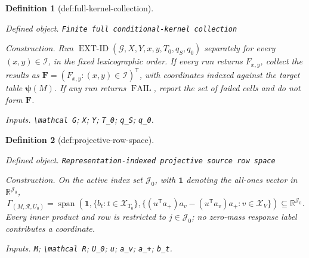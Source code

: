\documentclass{article}
\newtheorem{definition}{Definition}
\begin{document}
\begin{definition}[def:full-kernel-collection]\label{def:full-kernel-collection}
\par\smallskip\noindent\emph{Defined object.} \texttt{Finite full conditional-\allowbreak{}kernel collection}
\par\smallskip\noindent\emph{Construction.} Run \(\operatorname{EXT\text{-}ID}(\mathcal G,X,Y,x,y,T_0,q_S,q_0)\) separately for every \((x,y)\in\mathcal I\), in the fixed lexicographic order. If every run returns \(F_{x,y}\), collect the results as \(\mathbf F=(F_{x,y}:(x,y)\in\mathcal I)^{\mathsf T}\), with coordinates indexed against the target table \(\boldsymbol\psi(M)\). If any run returns \(\operatorname{FAIL}\), report the set of failed cells and do not form \(\mathbf F\).
\par\smallskip\noindent\emph{Inputs.} \texttt{\textbackslash{}\allowbreak{}mathcal G}; \texttt{X}; \texttt{Y}; \texttt{T\_\allowbreak{}0}; \texttt{q\_\allowbreak{}S}; \texttt{q\_\allowbreak{}0}.
\end{definition}

\begin{definition}[def:projective-row-space]\label{def:projective-row-space}
\par\smallskip\noindent\emph{Defined object.} \texttt{Representation-\allowbreak{}indexed projective source row space}
\par\smallskip\noindent\emph{Construction.} On the active index set \(\mathcal J_0\), with \(\mathbf 1\) denoting the all-ones vector in \(\mathbb R^{\mathcal J_0}\), \[\Gamma_{(M,\mathcal R,U_0)}=\operatorname{span}\left(\mathbf 1,\{b_t:t\in\mathcal X_{T_0}\},\{(u^{\mathsf T}a_+)a_v-(u^{\mathsf T}a_v)a_+:v\in\mathcal X_V\}\right)\subseteq\mathbb R^{\mathcal J_0}.\] Every inner product and row is restricted to \(j\in\mathcal J_0\); no zero-mass response label contributes a coordinate.
\par\smallskip\noindent\emph{Inputs.} \texttt{M}; \texttt{\textbackslash{}\allowbreak{}mathcal R}; \texttt{U\_\allowbreak{}0}; \texttt{u}; \texttt{a\_\allowbreak{}v}; \texttt{a\_\allowbreak{}+\allowbreak{}}; \texttt{b\_\allowbreak{}t}.
\end{definition}
\end{document}
